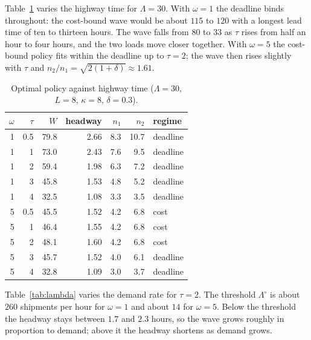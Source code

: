\documentclass[10pt, reqno]{amsart}
\theoremstyle{definition}
\begin{document}
Table~\ref{tab:tau} varies the highway time for $\Lambda=30$. With $\omega=1$ the deadline binds throughout: the cost-bound wave would be about $115$ to $120$ with a longest lead time of ten to thirteen hours. The wave falls from $80$ to $33$ as $\tau$ rises from half an hour to four hours, and the two loads move closer together. With $\omega=5$ the cost-bound policy fits within the deadline up to $\tau=2$; the wave then rises slightly with $\tau$ and $n_2/n_1=\sqrt{2(1+\delta)}\approx1.61$.

\begin{table}[h]
\centering
\caption{Optimal policy against highway time ($\Lambda=30$, $L=8$, $\kappa=8$, $\delta=0.3$).}\label{tab:tau}
\begin{tabular}{rrrrrrl}
\toprule
$\omega$ & $\tau$ & $W$ & headway & $n_1$ & $n_2$ & regime\\
\midrule
1 & 0.5 & 79.8 & 2.66 & 8.3 & 10.7 & deadline\\
1 & 1 & 73.0 & 2.43 & 7.6 & 9.5 & deadline\\
1 & 2 & 59.4 & 1.98 & 6.3 & 7.2 & deadline\\
1 & 3 & 45.8 & 1.53 & 4.8 & 5.2 & deadline\\
1 & 4 & 32.5 & 1.08 & 3.3 & 3.5 & deadline\\
\midrule
5 & 0.5 & 45.5 & 1.52 & 4.2 & 6.8 & cost\\
5 & 1 & 46.4 & 1.55 & 4.2 & 6.8 & cost\\
5 & 2 & 48.1 & 1.60 & 4.2 & 6.8 & cost\\
5 & 3 & 45.7 & 1.52 & 4.0 & 6.1 & deadline\\
5 & 4 & 32.8 & 1.09 & 3.0 & 3.7 & deadline\\
\bottomrule
\end{tabular}
\end{table}

Table~\ref{tab:lambda} varies the demand rate for $\tau=2$. The threshold $\Lambda^\circ$ is about $260$ shipments per hour for $\omega=1$ and about $14$ for $\omega=5$. Below the threshold the headway stays between $1.7$ and $2.3$ hours, so the wave grows roughly in proportion to demand; above it the headway shortens as demand grows.
\end{document}
